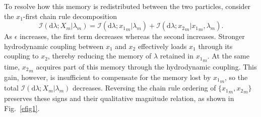 \documentclass[
 longbibliography,
 twocolumn,
 superscriptaddress,
 amsmath,
 amssymb,
 amsthm,
 amsfonts,
 prl,
 floatfix,
]{revtex4-2}
\begin{document}
To resolve how this memory is redistributed between the two particles, consider the $x_1$-first chain rule decomposition
\begin{equation*}
    \mathcal I(\mathrm d\lambda;X_m|\lambda_m)
    =\mathcal I(\mathrm d\lambda;{x_1}_m|\lambda_m)
    +\mathcal I(\mathrm d\lambda;{x_2}_m|{x_1}_m,\lambda_m).
\end{equation*}
As $\epsilon$ increases, the first term decreases whereas the second increases. Stronger hydrodynamic coupling between $x_1$ and $x_2$ effectively loads $x_1$ through its coupling to $x_2$, thereby reducing the memory of $\lambda$ retained in ${x_1}_m$.
At the same time, ${x_2}_m$ acquires part of this memory through the hydrodynamic coupling. This gain, however, is insufficient to compensate for the memory lost by ${x_1}_m$, so the total $\mathcal I(\mathrm d\lambda;X_m|\lambda_m)$ decreases. Reversing the chain rule ordering of $\{{x_1}_m,{x_2}_m\}$ preserves these signs and their qualitative magnitude relation, as shown in Fig.~\ref{efig1}.


\makeatletter
\let\@hangfrom@section\saved@hangfrom@section
\let\@sectioncntformat\saved@sectioncntformat
\let\thesection\saved@thesection
\let\thesubsection\saved@thesubsection
\let\thesubsubsection\saved@thesubsubsection
\let\cl@section\saved@cl@section
\let\theequation@prefix\saved@theequation@prefix
{}
\makeatother


\newpage
\begin{widetext}

\newpage
\end{widetext}
\end{document}
